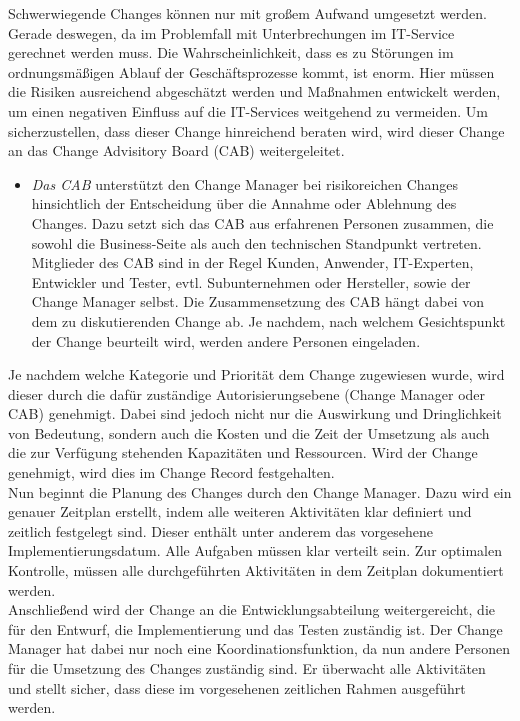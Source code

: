 Schwerwiegende Changes können nur mit großem Aufwand umgesetzt werden. Gerade deswegen, da im Problemfall mit Unterbrechungen im IT-Service gerechnet werden muss. Die Wahrscheinlichkeit, dass es zu Störungen im ordnungsmäßigen Ablauf der Geschäftsprozesse kommt, ist enorm. Hier müssen die Risiken ausreichend abgeschätzt werden und Maßnahmen entwickelt werden, um einen negativen Einfluss auf die IT-Services weitgehend zu vermeiden. Um sicherzustellen, dass dieser Change hinreichend beraten wird, wird dieser Change an das Change Advisitory Board (CAB) weitergeleitet. 
\begin{itemize}
	\item \textit{Das CAB} unterstützt den Change Manager bei risikoreichen Changes hinsichtlich der Entscheidung über die Annahme oder Ablehnung des Changes. Dazu setzt sich das CAB aus erfahrenen Personen zusammen, die sowohl die Business-Seite als auch den technischen Standpunkt vertreten. Mitglieder des CAB sind in der Regel Kunden, Anwender, IT-Experten, Entwickler und Tester, evtl. Subunternehmen oder Hersteller, sowie der Change Manager selbst. Die Zusammensetzung des CAB hängt dabei von dem zu diskutierenden Change ab. Je nachdem, nach welchem Gesichtspunkt der Change beurteilt wird, werden andere Personen eingeladen.
\end{itemize}
Je nachdem welche Kategorie und Priorität dem Change zugewiesen wurde, wird dieser durch die dafür zuständige Autorisierungsebene (Change Manager oder CAB) genehmigt. Dabei sind jedoch nicht nur die Auswirkung und Dringlichkeit von Bedeutung, sondern auch die Kosten und die Zeit der Umsetzung als auch die zur Verfügung stehenden Kapazitäten und Ressourcen. Wird der Change genehmigt, wird dies im Change Record festgehalten.
\\
Nun beginnt die Planung des Changes durch den Change Manager. Dazu wird ein genauer Zeitplan erstellt, indem alle weiteren Aktivitäten klar definiert und zeitlich festgelegt sind. Dieser enthält unter anderem das vorgesehene Implementierungsdatum. Alle Aufgaben müssen klar verteilt sein. Zur optimalen Kontrolle, müssen alle durchgeführten Aktivitäten in dem Zeitplan dokumentiert werden.
\\
Anschließend wird der Change an die Entwicklungsabteilung weitergereicht, die für den Entwurf, die Implementierung und das Testen zuständig ist. Der Change Manager hat dabei nur noch eine Koordinationsfunktion, da nun andere Personen für die Umsetzung des Changes zuständig sind. Er überwacht alle Aktivitäten und stellt sicher, dass diese im vorgesehenen zeitlichen Rahmen ausgeführt werden.
